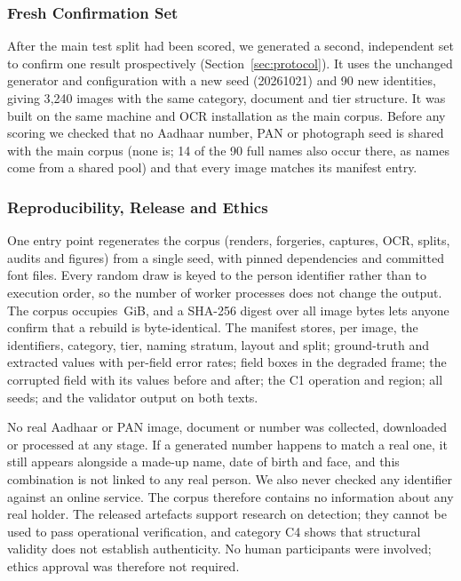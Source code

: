 \documentclass[12pt]{article}
\begin{document}
\subsubsection{Fresh Confirmation Set}
\label{subsec:fresh}

After the main test split had been scored, we generated a second,
independent set to confirm one result prospectively
(Section~\ref{sec:protocol}). It uses the unchanged generator and
configuration with a new seed (20261021) and 90 new identities, giving
3{,}240 images with the same category, document and tier structure. It
was built on the same machine and OCR installation as the main corpus.
Before any scoring we checked that no Aadhaar number, PAN or photograph
seed is shared with the main corpus (none is; 14 of the 90 full names
also occur there, as names come from a shared pool) and that every
image matches its manifest entry.

\subsubsection{Reproducibility, Release and Ethics}
\label{subsec:release}
\label{subsec:ethics}

One entry point regenerates the corpus (renders, forgeries, captures,
OCR, splits, audits and figures) from a single seed, with pinned
dependencies and committed font files. Every random draw is keyed to
the person identifier rather than to execution order, so the number of
worker processes does not change the output. The corpus occupies
\dsGiB\,GiB, and a SHA-256 digest over all image bytes lets anyone
confirm that a rebuild is byte-identical. The manifest stores, per
image, the identifiers, category, tier, naming stratum, layout and
split; ground-truth and extracted values with per-field error rates;
field boxes in the degraded frame; the corrupted field with its values
before and after; the C1 operation and region; all seeds; and the
validator output on both texts.

No real Aadhaar or PAN image, document or number was collected,
downloaded or processed at any stage. If a generated number happens to match a real one, it still appears alongside a made-up name, date of birth and face, and this combination is not linked to any real person. We also never checked any identifier against an online service. The corpus therefore
contains no information about any real holder. The released artefacts
support research on detection; they cannot be used to pass operational
verification, and category C4 shows that structural validity does not
establish authenticity. No human participants were involved; ethics approval was
therefore not required.
\end{document}

